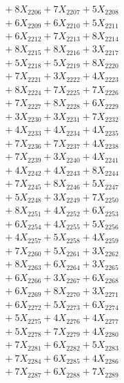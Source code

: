 \documentclass[a4paper,10pt]{article}
\begin{document}
{\begin{align}
&\;  + 8 X_{2206} + 7 X_{2207} + 5 X_{2208} \\[0.3ex]
&\;  + 6 X_{2209} + 6 X_{2210} + 5 X_{2211} \\[0.3ex]
&\;  + 6 X_{2212} + 7 X_{2213} + 8 X_{2214} \\[0.3ex]
&\;  + 8 X_{2215} + 8 X_{2216} + 3 X_{2217} \\[0.3ex]
&\;  + 5 X_{2218} + 5 X_{2219} + 8 X_{2220} \\[0.3ex]
&\;  + 7 X_{2221} + 3 X_{2222} + 4 X_{2223} \\[0.3ex]
&\;  + 8 X_{2224} + 7 X_{2225} + 7 X_{2226} \\[0.3ex]
&\;  + 7 X_{2227} + 8 X_{2228} + 6 X_{2229} \\[0.5ex]\allowbreak
&\;  + 3 X_{2230} + 3 X_{2231} + 7 X_{2232} \\[0.3ex]
&\;  + 4 X_{2233} + 4 X_{2234} + 4 X_{2235} \\[0.3ex]
&\;  + 7 X_{2236} + 7 X_{2237} + 4 X_{2238} \\[0.3ex]
&\;  + 7 X_{2239} + 3 X_{2240} + 4 X_{2241} \\[0.3ex]
&\;  + 4 X_{2242} + 4 X_{2243} + 8 X_{2244} \\[0.3ex]
&\;  + 7 X_{2245} + 8 X_{2246} + 5 X_{2247} \\[0.3ex]
&\;  + 5 X_{2248} + 3 X_{2249} + 7 X_{2250} \\[0.3ex]
&\;  + 8 X_{2251} + 4 X_{2252} + 6 X_{2253} \\[0.3ex]
&\;  + 6 X_{2254} + 4 X_{2255} + 5 X_{2256} \\[0.3ex]
&\;  + 4 X_{2257} + 5 X_{2258} + 4 X_{2259} \\[0.5ex]\allowbreak
&\;  + 7 X_{2260} + 5 X_{2261} + 3 X_{2262} \\[0.3ex]
&\;  + 8 X_{2263} + 6 X_{2264} + 3 X_{2265} \\[0.3ex]
&\;  + 6 X_{2266} + 3 X_{2267} + 6 X_{2268} \\[0.3ex]
&\;  + 6 X_{2269} + 8 X_{2270} + 3 X_{2271} \\[0.3ex]
&\;  + 6 X_{2272} + 5 X_{2273} + 6 X_{2274} \\[0.3ex]
&\;  + 5 X_{2275} + 4 X_{2276} + 4 X_{2277} \\[0.3ex]
&\;  + 5 X_{2278} + 7 X_{2279} + 4 X_{2280} \\[0.3ex]
&\;  + 7 X_{2281} + 6 X_{2282} + 5 X_{2283} \\[0.3ex]
&\;  + 7 X_{2284} + 6 X_{2285} + 4 X_{2286} \\[0.3ex]
&\;  + 7 X_{2287} + 6 X_{2288} + 7 X_{2289} \\[0.5ex]\allowbreak

\end{align}}
\end{document}
